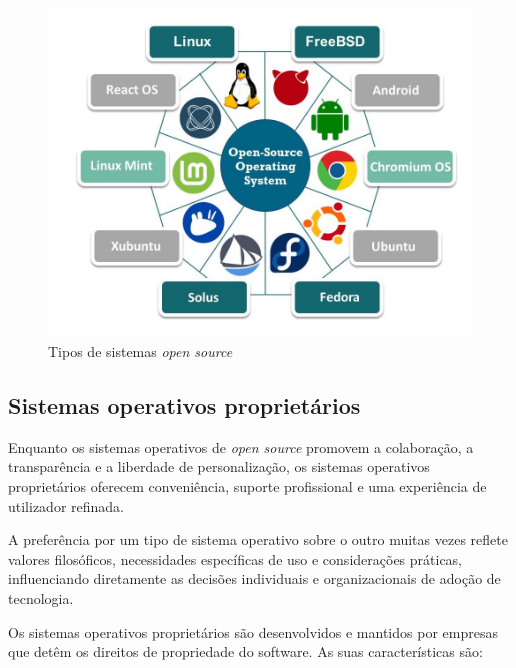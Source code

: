 \begin{figure}[H]
  \centering
  \includegraphics[scale=1.62]{Figures/0. General/sistemas_open_source.jpg}
  \caption{Tipos de sistemas \textit{open source}}
  \label{Tipos de sistemas open source}
\end{figure}

\newpage

\subsection{Sistemas operativos proprietários}

Enquanto os sistemas operativos de \textit{open source} promovem a colaboração, a transparência e a liberdade de personalização, os sistemas operativos proprietários oferecem conveniência, suporte profissional e uma experiência de utilizador refinada. \cite{advantagesOfProprietary}
\par \vspace{6pt}
A preferência por um tipo de sistema operativo sobre o outro muitas vezes reflete valores filosóficos, necessidades específicas de uso e considerações práticas, influenciando diretamente as decisões individuais e organizacionais de adoção de tecnologia.
\par \vspace{6pt}
Os sistemas operativos proprietários são desenvolvidos e mantidos por empresas que detêm os direitos de propriedade do software. As suas características são:

